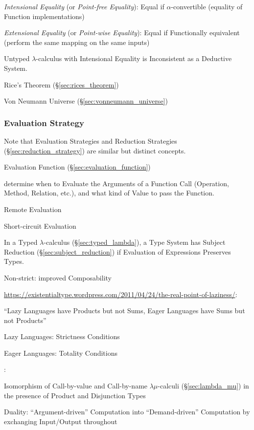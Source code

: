 \emph{Intensional Equality} (or \emph{Point-free Equality}): Equal if
$\alpha$-convertible (equality of Function implementations)

\emph{Extensional Equality} (or \emph{Point-wise Equality}): Equal if
Functionally equivalent (perform the same mapping on the same inputs)

Untyped $\lambda$-calculus with Intensional Equality is Inconsistent
as a Deductive System.

Rice's Theorem (\S\ref{sec:rices_theorem})

Von Neumann Universe (\S\ref{sec:vonneumann_universe})



\subsubsection{Evaluation Strategy}\label{sec:evaluation_strategy}

\fist Note that Evaluation Strategies and Reduction Strategies
(\S\ref{sec:reduction_strategy}) are similar but distinct concepts.

Evaluation Function (\S\ref{sec:evaluation_function})

determine when to Evaluate the Arguments of a Function Call
(Operation, Method, Relation, etc.), and what kind of Value to pass
the Function.

Remote Evaluation

Short-circuit Evaluation

In a Typed $\lambda$-calculus (\S\ref{sec:typed_lambda}), a Type
System has Subject Reduction (\S\ref{sec:subject_reduction}) if
Evaluation of Expressions Preserves Types.

Non-strict: improved Composability %

\url{https://existentialtype.wordpress.com/2011/04/24/the-real-point-of-laziness/}:

``Lazy Languages have Products but not Sums, Eager Languages have Sums
but not Products''

Lazy Languages: Strictness Conditions %

Eager Languages: Totality Conditions %


\asterism


\cite{selinger01}:

Isomorphism of Call-by-value and Call-by-name $\lambda\mu$-calculi
(\S\ref{sec:lambda_mu}) in the presence of Product and Disjunction
Types

Duality: ``Argument-driven'' Computation into ``Demand-driven''
Computation by exchanging Input/Output throughout

